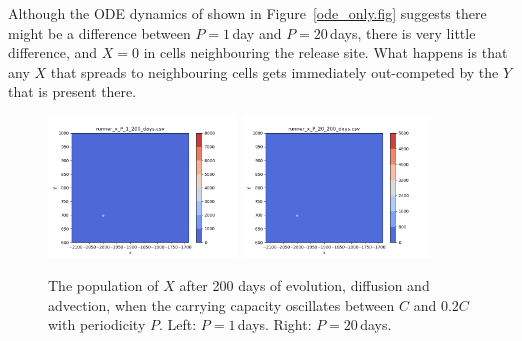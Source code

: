\documentclass{article}
\begin{document}
Although the ODE dynamics of shown in Figure~\ref{ode_only.fig} suggests there might be a difference between $P=1$\,day and $P=20$\,days, there is very little difference, and $X=0$ in cells neighbouring the release site.  What happens is that any $X$ that spreads to neighbouring cells gets immediately out-competed by the $Y$ that is present there.

\begin{figure}[htb]
  \centering
  \includegraphics[width=5cm]{runner_x_P_1_200_days.png} \quad
  \includegraphics[width=5cm]{runner_x_P_20_200_days.png}
  \caption{\label{runner_x_P_1_200_days.fig}The population of $X$ after 200 days of evolution, diffusion and advection, when the carrying capacity oscillates between $C$ and $0.2C$ with periodicity $P$.  Left: $P=1$\,days.  Right: $P=20$\,days.}
\end{figure}
\end{document}

